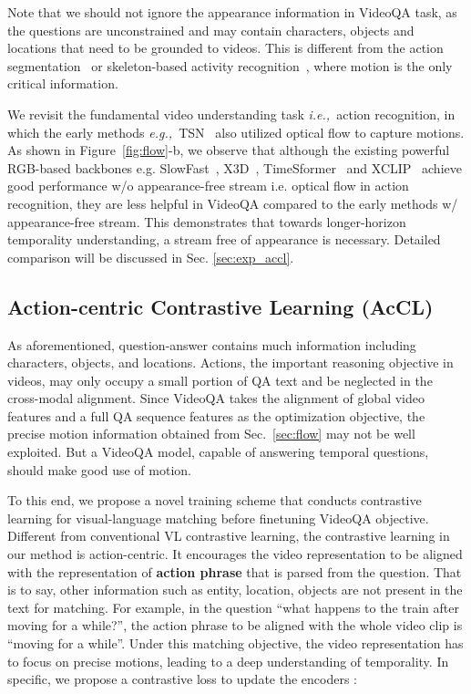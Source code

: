 \documentclass[sigconf]{acmart}
\newcommand{\ie}{\emph{i.e.,~}}
\newcommand{\eg}{\emph{e.g.,~}}
\begin{document}
Note that we should not ignore the appearance information in VideoQA task, as the questions are unconstrained and may contain characters, objects and locations that need to be grounded to videos. This is different from the action segmentation~\cite{ding2021temporal} or skeleton-based activity recognition~\cite{zhou2021composer,duan2022revisiting}, where motion is the only critical information.

We revisit the fundamental video understanding task \ie action recognition, in which the early methods \eg TSN~\cite{wang2016temporal, carreira2017quo} also utilized optical flow to capture motions. As shown in Figure~\ref{fig:flow}-b, we observe that although the existing powerful RGB-based backbones e.g. SlowFast~\cite{feichtenhofer2019slowfast}, X3D~\cite{feichtenhofer2020x3d}, TimeSformer~\cite{bertasius2021space} and XCLIP~\cite{ni2022expanding} achieve good performance w/o appearance-free stream i.e. optical flow in action recognition, they are less helpful in VideoQA compared to the early methods w/ appearance-free stream. This demonstrates that towards longer-horizon temporality understanding, a stream free of appearance is necessary. Detailed comparison will be discussed in Sec. \ref{sec:exp_accl}.




\subsection{Action-centric Contrastive Learning (AcCL)}
\label{sec:accl}
As aforementioned, question-answer contains much information including characters, objects, and locations. Actions, the important reasoning objective in videos, may only occupy a small portion of QA text and be neglected in the cross-modal alignment.
Since VideoQA takes the alignment of global video features and a full QA sequence features as the optimization objective, the precise motion information obtained from Sec.~\ref{sec:flow} may not be well exploited.
But a VideoQA model, capable of answering temporal questions, should make good use of motion.

To this end, we propose a novel training scheme that conducts contrastive learning for visual-language matching before finetuning VideoQA objective. Different from conventional VL contrastive learning, the contrastive learning in our method is action-centric. 
It encourages the video representation to be aligned with the representation of \textbf{action phrase} that is parsed from the question. That is to say, other information such as entity, location, objects are not present in the text for matching. For example, in the question ``what happens to the train after moving for a while?'', the action phrase to be aligned with the whole video clip is ``moving for a while''.
Under this matching objective, the video representation has to focus on precise motions, leading to a deep understanding of temporality. 
In specific, we propose a contrastive loss  to update the encoders :
\end{document}
